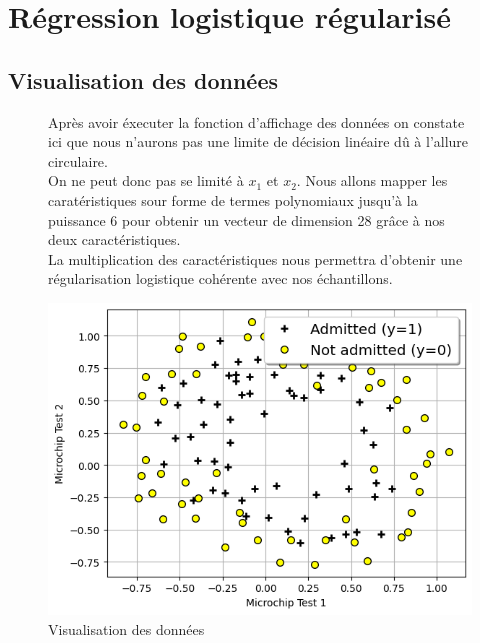 \clearpage
\section{Régression logistique régularisé}

\subsection{Visualisation des données}
\begin{figure}[!h]
    \begin{minipage}{.48\linewidth}
        Après avoir éxecuter la fonction d'affichage des données on constate ici que nous n'aurons pas une limite de décision linéaire dû à l'allure circulaire. \\
        On ne peut donc pas se limité à $x_1$ et $x_2$. Nous allons mapper les caratéristiques sour forme de termes polynomiaux jusqu'à la puissance 6 pour obtenir un 
        vecteur de dimension 28 grâce à nos deux caractéristiques. \\
        La multiplication des caractéristiques nous permettra d'obtenir une régularisation logistique cohérente avec nos échantillons.

    \end{minipage}\hfill
    \begin{minipage}{.48\linewidth}
        \begin{center}
            \includegraphics[width=1\textwidth]{./img/4.1.png}
            \caption{\label{fig:4.1}Visualisation des données}  
        \end{center}
    \end{minipage}
\end{figure}

